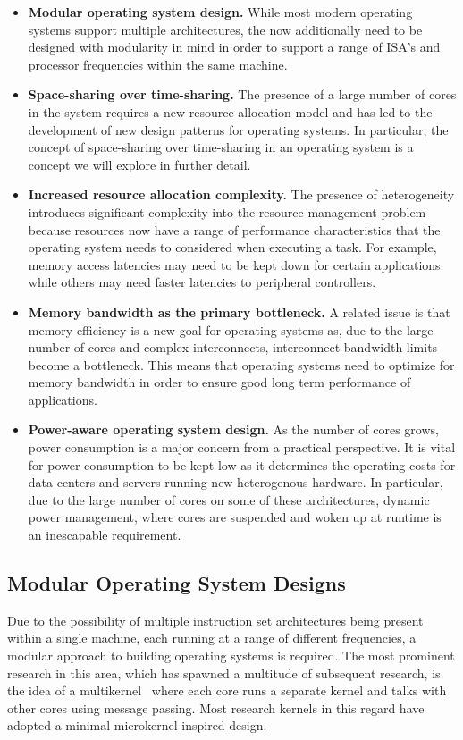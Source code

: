\begin{itemize}
\item \textbf{Modular operating system design.} While most modern operating systems support multiple architectures, the now
additionally need to be designed with modularity in mind in order to support a range
of ISA's and processor frequencies within the same machine.
\item \textbf{Space-sharing over time-sharing.} The presence of a large number of cores in the system requires a new resource allocation model and has led to the development
of new design patterns for operating systems. In particular, the concept of space-sharing over time-sharing in an operating system is a concept we will explore in further detail.
\item \textbf{Increased resource allocation complexity.} The presence of heterogeneity introduces significant complexity into the resource
management problem because resources now have a range of performance characteristics
that the operating system needs to considered when executing a task. For example, memory access latencies may need to be kept down for certain applications while others may need faster latencies to peripheral controllers.
\item \textbf{Memory bandwidth as the primary bottleneck.} A related issue is that memory efficiency is a new goal for operating systems as, due to the large number of cores and complex interconnects, interconnect bandwidth limits become a bottleneck. This means that operating systems need to optimize for memory bandwidth in order to ensure good long term performance of applications.
\item \textbf{Power-aware operating system design.} As the number of cores grows, power consumption is a major concern from a practical perspective. It is vital for power consumption to be kept low as it determines the operating costs for data centers and servers running new heterogenous hardware. In particular, due to the large number of cores on some of these architectures, dynamic power management, where cores are suspended and woken up at runtime is an inescapable requirement.
\end{itemize}

\subsection{Modular Operating System Designs}

Due to the possibility of multiple instruction set architectures being present within a
single machine, each running at a range of different frequencies, a modular approach to building operating systems is required. The most prominent research in this area, which has spawned a multitude of subsequent research, is the idea of a multikernel~\cite{barrelfish} where each core runs a separate kernel and talks with other cores using message passing. Most research kernels in this regard have adopted a minimal microkernel-inspired design.

